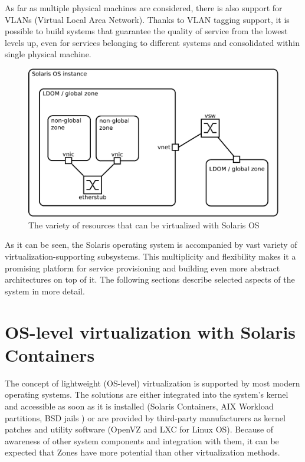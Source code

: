 \documentclass[11pt]{book}
\begin{document}
      As far as multiple physical machines are considered, there is also support for VLANs (Virtual Local Area Network).
      Thanks to VLAN tagging support, it is possible to build systems that guarantee the quality of service from the
      lowest levels up, even for services belonging to different systems and consolidated within single physical machine.

      \begin{figure}[H]
        \begin{center}
          \includegraphics[width=.7\textwidth]{img/solaris/full-featured.pdf}
        \end{center}

        \caption{The variety of resources that can be virtualized with Solaris OS}
      \end{figure}

      As it can be seen, the Solaris operating system is accompanied by vast variety of virtualization-supporting
      subsystems. This multiplicity and flexibility makes it a promising platform for service provisioning and building
      even more abstract architectures on top of it. The following sections describe selected aspects of the system in
      more detail.


    \section{OS-level virtualization with Solaris Containers}
    \label{sec:sol:containers}


      The concept of lightweight (OS-level) virtualization is supported by most modern operating systems. The solutions
      are either integrated into the system's kernel and accessible as soon as it is installed (Solaris Containers, AIX
      Workload partitions, BSD jails \cite{kamp}) or are provided by third-party manufacturers as kernel patches and
      utility software (OpenVZ and LXC for Linux OS). Because of awareness of other system components and integration 
      with them, it can be expected that Zones have more potential than other virtualization methods.
\end{document}
